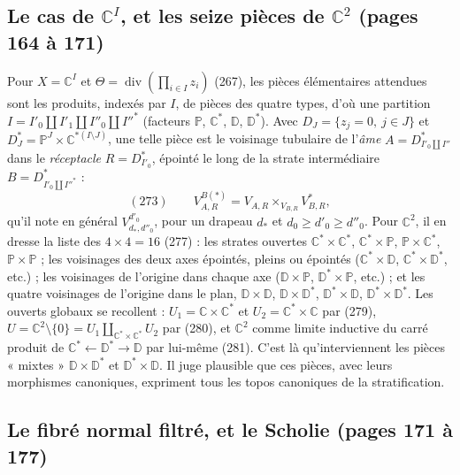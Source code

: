\documentclass[11pt,a4paper]{article}
\begin{document}
\subsection*{Le cas de $\mathbb{C}^I$, et les seize pièces de $\mathbb{C}^2$ (pages 164 à 171)}

Pour $X = \mathbb{C}^I$ et $\Theta = \operatorname{div}(\prod_{i \in I} z_i)$ (267),
les pièces élémentaires attendues sont les produits, indexés par $I$, de pièces
des quatre types, d'où une partition $I = I'_0 \amalg I'_1 \amalg I''_0 \amalg
I''^{*}$ (facteurs $\mathbb{P}$, $\mathbb{C}^*$, $\mathbb{D}$, $\mathbb{D}^*$). Avec
$D_J = \{z_j = 0,\ j \in J\}$ et $D^{*}_J = \mathbb{P}^J \times \mathbb{C}^{*(I
\setminus J)}$, une telle pièce est le voisinage tubulaire de l'\emph{âme} $A =
D^{*}_{I'_0 \amalg I''}$ dans le \emph{réceptacle} $R = D^{*}_{I'_0}$, épointé le
long de la strate intermédiaire $B = D^{*}_{I'_0 \amalg I''^{*}}$ :
\[
(273) \qquad V^{B(*)}_{A,R} = V_{A,R} \times_{V_{B,R}} V^{*}_{B,R},
\]
qu'il note en général $V^{d'_0}_{d_*, d''_0}$, pour un drapeau $d_*$ et $d_0 \geq
d'_0 \geq d''_0$. Pour $\mathbb{C}^2$, il en dresse la liste des $4 \times 4 = 16$
(277) : les strates ouvertes $\mathbb{C}^* \times \mathbb{C}^*$, $\mathbb{C}^*
\times \mathbb{P}$, $\mathbb{P} \times \mathbb{C}^*$, $\mathbb{P} \times
\mathbb{P}$ ; les voisinages des deux axes épointés, pleins ou épointés
($\mathbb{C}^* \times \mathbb{D}$, $\mathbb{C}^* \times \mathbb{D}^*$, etc.) ; les
voisinages de l'origine dans chaque axe ($\mathbb{D} \times \mathbb{P}$,
$\mathbb{D}^* \times \mathbb{P}$, etc.) ; et les quatre voisinages de l'origine
dans le plan, $\mathbb{D} \times \mathbb{D}$, $\mathbb{D} \times \mathbb{D}^*$,
$\mathbb{D}^* \times \mathbb{D}$, $\mathbb{D}^* \times \mathbb{D}^*$. Les ouverts
globaux se recollent : $U_1 = \mathbb{C} \times \mathbb{C}^*$ et $U_2 =
\mathbb{C}^* \times \mathbb{C}$ par (279), $U = \mathbb{C}^2 \setminus \{0\} =
U_1 \amalg_{\mathbb{C}^* \times \mathbb{C}^*} U_2$ par (280), et $\mathbb{C}^2$
comme limite inductive du carré produit de $\mathbb{C}^* \leftarrow \mathbb{D}^*
\rightarrow \mathbb{D}$ par lui-même (281). C'est là qu'interviennent les pièces
« mixtes » $\mathbb{D} \times \mathbb{D}^*$ et $\mathbb{D}^* \times \mathbb{D}$.
Il juge plausible que ces pièces, avec leurs morphismes canoniques, expriment
tous les topos canoniques de la stratification.

\subsection*{Le fibré normal filtré, et le Scholie (pages 171 à 177)}
\end{document}
